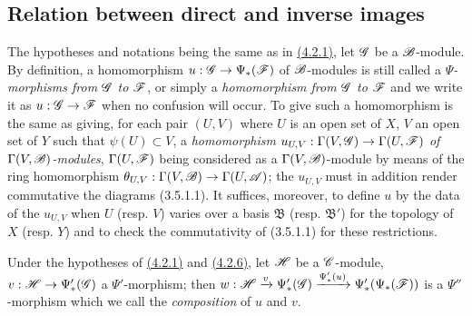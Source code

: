 \subsection{Relation between direct and inverse images}
\label{subsection-relation-between-direct-and-inverse-images}

\begin{env}[4.4.1]
\label{env-0.4.4.1}
The hypotheses and notations being the same as in \hyperref[env-0.4.2.1]{(4.2.1)}, let
$\mathscr{G}$ be a $\mathscr{B}$-module. By definition, a homomorphism
$u:\mathscr{G}\to\Psi_*(\mathscr{F})$ of $\mathscr{B}$-modules is still called a
{\em $\Psi$-morphisms from $\mathscr{G}$ to $\mathscr{F}$}, or simply a
{\em homomorphism from $\mathscr{G}$ to $\mathscr{F}$} and we write it as
$u:\mathscr{G}\to\mathscr{F}$ when no confusion will occur. To give such a homomorphism is
the same as giving, for each pair $(U,V)$ where $U$ is an open set of $X$, $V$
an open set of $Y$ such that $\psi(U)\subset V$, a {\em homomorphism
$u_{U,V}:\Gamma(V,\mathscr{G})\to\Gamma(U,\mathscr{F})$ of $\Gamma(V,\mathscr{B})$-modules},
$\Gamma(U,\mathscr{F})$ being considered as a $\Gamma(V,\mathscr{B})$-module by means of
the ring homomorphism $\theta_{U,V}:\Gamma(V,\mathscr{B})\to\Gamma(U,\mathscr{A})$; the
$u_{U,V}$ must in addition render commutative the diagrams (3.5.1.1). It
suffices, moreover, to define $u$ by the data of the $u_{U,V}$ when $U$
(resp. $V$) varies over a basis $\mathfrak{B}$ (resp. $\mathfrak{B}'$) for the
topology of $X$ (resp. $Y$) and to check the commutativity of (3.5.1.1) for
these restrictions.
\end{env}

\begin{env}[4.4.2]
\label{env-0.4.4.2}
Under the hypotheses of \hyperref[env-0.4.2.1]{(4.2.1)} and \hyperref[env-0.4.2.6]{(4.2.6)}, let $\mathscr{H}$ be
a $\mathscr{C}$-module, $v:\mathscr{H}\to\Psi_*'(\mathscr{G})$ a $\Psi'$-morphism; then
$w:\mathscr{H}\xrightarrow{v}\Psi_*'(\mathscr{G})
  \xrightarrow{\Psi_*'(u)}\Psi_*'(\Psi_*(\mathscr{F}))$ is a $\Psi''$-morphism which
we call the {\em composition} of $u$ and $v$.
\end{env}

